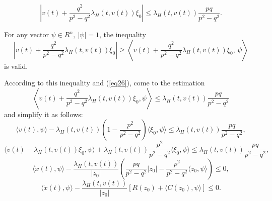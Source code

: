 \documentclass[10 pt]{book}
\begin{document}
\begin{equation} \label{eq26}
\left|v(t)+\frac{q^{2} }{p^{2} - q^{2} }\lambda_{H}(t,v(t)) \xi _{0} \right|\leq \lambda_{H}(t,v(t))\frac{pq }{p^{2} -q^{2}}.
\end{equation}

For any vector $\psi \in R^{n} , \ |\psi|=1$, the inequality
$$ \left|v(t)+\frac{q^{2} }{p^{2} - q^{2} }\lambda_{H} (t,v(t)) \xi _{0} \right|\geq \left\langle v(t)+
\frac{q^{2} }{p^{2} -q^{2} }\lambda_{H} (t,v(t)) \xi _{0} ,\, \psi \right\rangle $$ is valid.

According to this inequality and (\ref{eq26}), come to the estimation
$$\left\langle v(t)+\frac {q^{2} }{p^{2} - q^{2} }\lambda_{H}(t,v(t)) \xi _{0} ,\psi \right\rangle \leq \lambda_{H} (t,v(t))\frac{pq }{p ^{2} - q^{2} }$$
and simplify it as follows:
$$\langle v(t),\psi \rangle - \lambda_{H}(t,v(t))\left(1-\frac {p^{2} }{p^{2} - q^{2} } \right)
\langle \xi _{0} , \psi \rangle \leq \lambda_{H}(t,v(t))\frac{pq}{p^{2} - q^{2}},$$
$$\langle v(t)-\lambda_{H}(t,v(t))\xi _{0} ,\psi \rangle + \lambda_{H}(t,v(t))\frac{p^{2}}
{p^{2} -q^{2} } \langle \xi _{0} ,\psi \rangle \leq \lambda_{H}(t,v(t))\frac{pq}{p^{2} -q^{2}},$$
$$\langle \dot{x}(t),\psi \rangle -\frac{\lambda_{H}(t,v(t))}{|z_{0}|}\left(\frac{pq}{p^{2} -q^{2} } |z_{0} |-\frac{p^{2}}{p^{2} -q^{2}} \langle z_{0} , \psi \rangle \right)\leq 0,$$
$$\langle\dot{x}(t),\psi\rangle-\frac{\lambda_{H}(t,v(t))}{|z_{0}|}[R(z_0)+\langle C(z_0),\psi\rangle]\leq0.$$
\end{document}
